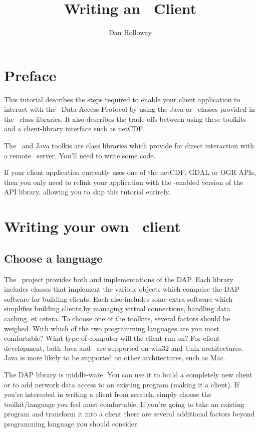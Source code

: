 \documentclass{dods-paper}
\title{Writing an \opendap\ Client}
\author{Dan Holloway}
\begin{document}
\maketitle

\T\tableofcontents

\section{Preface}

This tutorial describes the steps required to enable your client
application to interact with the \opendap\ Data Access Protocol by using
the Java or \Cpp\ classes provided in the \opendap\ class libraries. It also
describes the trade offs between using these toolkits and a client-library
interface such as netCDF.

The \Cpp\ and Java toolkis are class libraries which provide for direct
interaction with a remote \opendap\ server. You'll need to write some code.

If your client application currently uses one of the netCDF, GDAL or OGR
APIs, then you only need to relink your application with the \opendap-enabled
version of the API library, allowing you to skip this tutorial entirely.
  
\section{Writing your own \opendap\ client}

\subsection{Choose a language}  

The \opendap\ project provides both \xlink{\Cpp}{\OPDapiUrl} and
 implementations of the DAP. Each library includes
classes that implement the various objects which comprise the DAP software
for building clients. Each also includes some extra software which simplifies
building clients by managing virtual connections, handling data caching, et
cetera. To choose one of the toolkits, several factors should be weighed.
With which of the two programming languages are you most comfortable? What
type of computer will the client run on? For client development, both Java
and \Cpp\ are supported on win32 and Unix architectures. Java is more likely to
be supported on other architectures, such as Mac.

The DAP library is middle-ware. You can use it to build a completely new
client or to add network data access to an existing program (making it a
client). If you're interested in writing a client from scratch, simply choose
the toolkit/language you feel most comfortable. If you're going to take an
existing program and transform it into a client there are several
additional factors beyond programming language you should consider.
\end{document}
